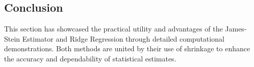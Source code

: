 \subsection{Conclusion}

This section has showcased the practical utility and advantages of the James-Stein Estimator and Ridge Regression through detailed computational demonstrations. Both methods are united by their use of shrinkage to enhance the accuracy and dependability of statistical estimates.